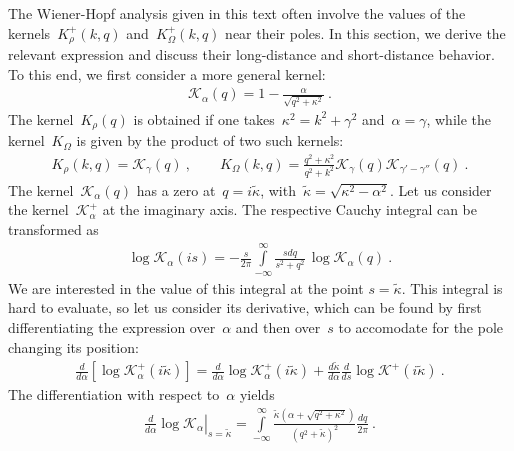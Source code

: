 \documentclass[preprint,aps,eqsecnum]{revtex4-1}
\newcommand{\fplus}[1]{{#1}^{+}}
\begin{document}
The Wiener-Hopf analysis given in this text often involve the
values of the kernels~$\fplus{K}_\rho(k, q)$ and~$\fplus{K}_\Omega(k, q)$ near
their poles. In this section, we derive the relevant expression
and discuss their long-distance and short-distance behavior.
To this end, we first consider a more general kernel:
\begin{align}
  \mathcal{K}_\alpha(q) = 1 - \frac{\alpha}{\sqrt{q^2 + \kappa^2}}\ .
\end{align}
The kernel~$K_\rho(q)$ is obtained if one takes~$\kappa^2 = k^2 + \gamma^2$
and~$\alpha = \gamma$, while the kernel~$K_\Omega$ is given by
the product of two such kernels:
\begin{align}
  \label{eq:appA-representation}
  K_\rho(k, q) = \mathcal{K}_\gamma(q)\ , \qquad
  K_\Omega(k, q) = \frac{q^2 + \kappa^2}{q^2 + k^2}
 \mathcal{K}_{\gamma}(q) \mathcal{K}_{\gamma' - \gamma''}(q)\ .
\end{align}
The kernel~$\mathcal{K}_\alpha(q)$ has a zero at~$q = i {\tilde \kappa}$,
with~${\tilde \kappa} = \sqrt{\kappa^2 - \alpha^2}$.
Let us consider the kernel~$\fplus{\mathcal{K}}_\alpha$ at the imaginary axis.
The respective Cauchy integral can be transformed as
\begin{align}
  \log \mathcal{K}_{\alpha}(is) = - \frac{s}{2\pi}
  \int\limits_{-\infty}^{\infty}
  \frac{s dq}{s^2 + q^2} \, \log \mathcal{K}_{\alpha}(q)\ .
\end{align}
We are interested in the value of this integral at the point
$s = {\tilde\kappa}$.
This integral is hard to evaluate, so let us consider its derivative,
which can be found by first differentiating the expression over~$\alpha$
and then over~$s$ to accomodate for the pole changing its position:
\begin{align}
  \label{eq:appA-two-contribs}
  \frac{d}{d\alpha} [\log \fplus{\mathcal{K}}_\alpha(i{\tilde \kappa})] =
  \frac{d}{d\alpha} \log \fplus{\mathcal{K}}_\alpha(i{\tilde \kappa})
  + \frac{d{\tilde \kappa}}{d\alpha}
  \frac{d}{ds} \log \fplus{\mathcal{K}} (i{\tilde \kappa}) \ .
\end{align}
The differentiation with respect to~$\alpha$ yields
\begin{align}
  \left.\frac{d}{d\alpha}\log \mathcal{K}_{\alpha}
  \right|_{s = {\tilde\kappa}}
  = \int\limits_{-\infty}^{\infty}
  \frac{{\tilde\kappa} (\alpha + \sqrt{q^2 + \kappa^2})}{
  \left(q^2 + {\tilde \kappa}\right)^2} \frac{dq}{2\pi}
  \ .
\end{align}
\end{document}
